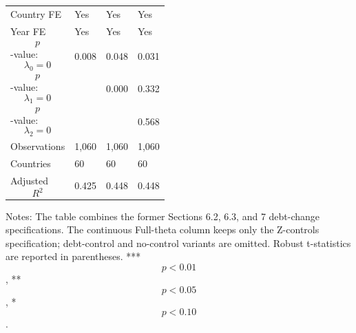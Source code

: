 \begin{table}[H]
\begin{threeparttable}
\begin{tabularx}{\textwidth}{lYYY}
Country FE & Yes & Yes & Yes \\
Year FE & Yes & Yes & Yes \\
$$p$$-value: $$\lambda_0=0$$ & 0.008 & 0.048 & 0.031 \\
$$p$$-value: $$\lambda_1=0$$ &  & 0.000 & 0.332 \\
$$p$$-value: $$\lambda_2=0$$ &  &  & 0.568 \\
Observations & 1,060 & 1,060 & 1,060 \\
Countries & 60 & 60 & 60 \\
Adjusted $$R^2$$ & 0.425 & 0.448 & 0.448 \\
\bottomrule
\end{tabularx}
\begin{tablenotes}[flushleft]\footnotesize
\item Notes: The table combines the former Sections 6.2, 6.3, and 7 debt-change specifications. The continuous Full-theta column keeps only the Z-controls specification; debt-control and no-control variants are omitted. Robust t-statistics are reported in parentheses. *** $$p<0.01$$, ** $$p<0.05$$, * $$p<0.10$$.
\end{tablenotes}
\end{threeparttable}
\end{table}
